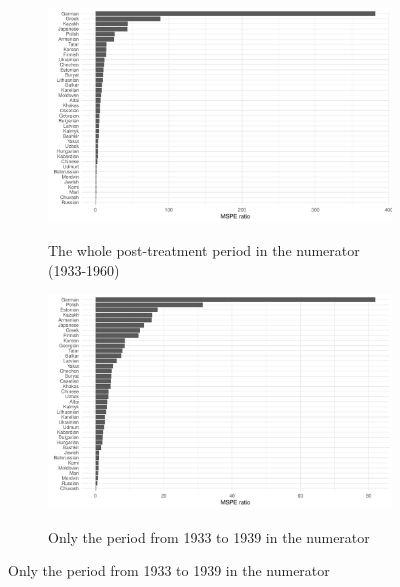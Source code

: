 \begin{figure}[hbtp] 
\caption{Ratios of post-treatment MSPE to pre-treatment MSPE}
\begin{subfigure}{\textwidth}
\caption{The whole post-treatment period in the numerator (1933-1960)}
\includegraphics[width=\linewidth]{plots/synthetic_control/ethnicity_imputation/annual/mspe_ratios_imp_date.pdf}
\label{fig:sc_mspe_ratios_all}
\end{subfigure}
\begin{subfigure}{\textwidth}
\caption{Only the period from 1933 to 1939 in the numerator}
\includegraphics[width=\linewidth]{plots/synthetic_control/ethnicity_imputation/annual/mspe_ratios_imp_date_until_1939.pdf}
\label{fig:sc_mspe_ratios_until_1939}
\end{subfigure}
\label{fig:sc_mspe_ratios}
\end{figure}


